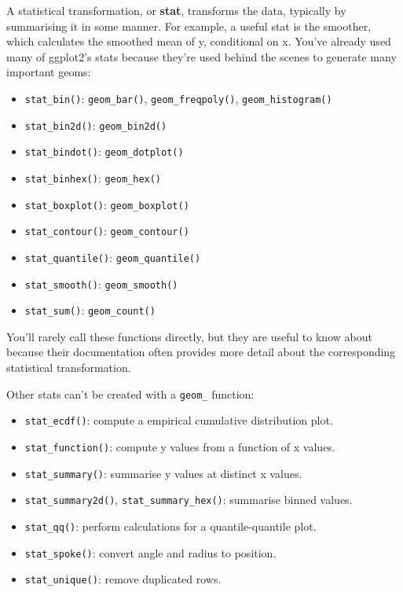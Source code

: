 
A statistical transformation, or \textbf{stat}, transforms the data,
typically by summarising it in some manner. For example, a useful stat
is the smoother, which calculates the smoothed mean of y, conditional on
x. You've already used many of ggplot2's stats because they're used
behind the scenes to generate many important geoms:

\begin{itemize}
\tightlist
\item
  \texttt{stat\_bin()}: \texttt{geom\_bar()}, \texttt{geom\_freqpoly()},
  \texttt{geom\_histogram()}
\item
  \texttt{stat\_bin2d()}: \texttt{geom\_bin2d()}
\item
  \texttt{stat\_bindot()}: \texttt{geom\_dotplot()}
\item
  \texttt{stat\_binhex()}: \texttt{geom\_hex()}
\item
  \texttt{stat\_boxplot()}: \texttt{geom\_boxplot()}
\item
  \texttt{stat\_contour()}: \texttt{geom\_contour()}
\item
  \texttt{stat\_quantile()}: \texttt{geom\_quantile()}
\item
  \texttt{stat\_smooth()}: \texttt{geom\_smooth()}
\item
  \texttt{stat\_sum()}: \texttt{geom\_count()}
\end{itemize}

You'll rarely call these functions directly, but they are useful to know
about because their documentation often provides more detail about the
corresponding statistical transformation.

Other stats can't be created with a \texttt{geom\_} function:

\begin{itemize}
\tightlist
\item
  \texttt{stat\_ecdf()}: compute a empirical cumulative distribution
  plot.
\item
  \texttt{stat\_function()}: compute y values from a function of x
  values.
\item
  \texttt{stat\_summary()}: summarise y values at distinct x values.
\item
  \texttt{stat\_summary2d()}, \texttt{stat\_summary\_hex()}: summarise
  binned values.
\item
  \texttt{stat\_qq()}: perform calculations for a quantile-quantile
  plot.
\item
  \texttt{stat\_spoke()}: convert angle and radius to position.
\item
  \texttt{stat\_unique()}: remove duplicated rows.
\end{itemize}

